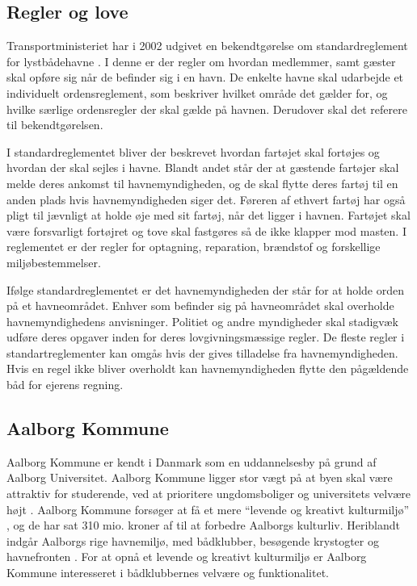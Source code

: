 
\subsection{Regler og love}
Transportministeriet har i 2002 udgivet en bekendtgørelse om standardreglement for lystbådehavne \cite{standardreglement}. I denne er der regler om hvordan medlemmer, samt gæster skal opføre sig når de befinder sig i en havn. De enkelte havne skal udarbejde et individuelt ordensreglement, som beskriver hvilket område det gælder for, og hvilke særlige ordensregler der skal gælde på havnen. Derudover skal det referere til bekendtgørelsen.

I standardreglementet bliver der beskrevet hvordan fartøjet skal fortøjes og hvordan der skal sejles i havne. Blandt andet står der at gæstende fartøjer skal melde deres ankomst til havnemyndigheden, og de skal flytte deres fartøj til en anden plads hvis havnemyndigheden siger det. Føreren af ethvert fartøj har også pligt til jævnligt at holde øje med sit fartøj, når det ligger i havnen. Fartøjet skal være forsvarligt fortøjret og tove skal fastgøres så de ikke klapper mod masten. I reglementet er der regler for optagning, reparation, brændstof og forskellige miljøbestemmelser.

Ifølge standardreglementet er det havnemyndigheden der står for at holde orden på et havneområdet. Enhver som befinder sig på havneområdet skal overholde havnemyndighedens anvisninger. Politiet og andre myndigheder skal stadigvæk udføre deres opgaver inden for deres lovgivningsmæssige regler. De fleste regler i standartreglementer kan omgås hvis der gives tilladelse fra havnemyndigheden. Hvis en regel ikke bliver overholdt kan havnemyndigheden flytte den pågældende båd for ejerens regning.


\subsection{Aalborg Kommune}

Aalborg Kommune er kendt i Danmark som en uddannelsesby på grund af Aalborg Universitet. Aalborg Kommune ligger stor vægt på at byen skal være attraktiv for studerende, ved at prioritere ungdomsboliger og universitets velvære højt \cite{udd-strat-aalborg}. Aalborg Kommune forsøger at få et mere \enquote{levende og kreativt kulturmiljø} \cite{AalborgSatserPaaKultur}, og de har sat 310 mio. kroner af til at forbedre Aalborgs kulturliv. Heriblandt indgår Aalborgs rige havnemiljø, med bådklubber, besøgende krystogter og havnefronten \cite{AalborgHavnefront}. For at opnå et levende og kreativt kulturmiljø er Aalborg Kommune interesseret i bådklubbernes velvære og funktionalitet.

